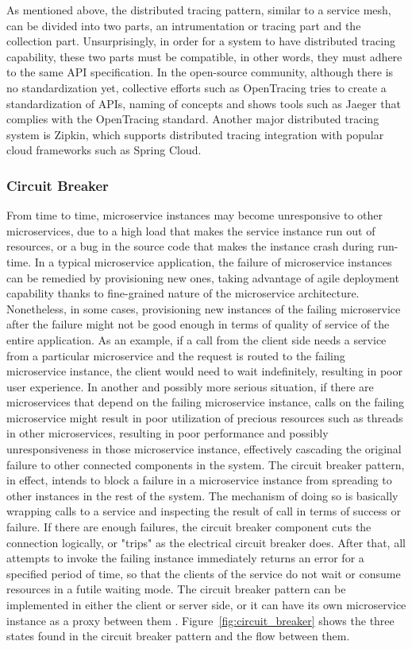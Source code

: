 \documentclass{Configuration_Files/PoliMi3i_thesis}
\begin{document}
As mentioned above, the distributed tracing pattern, similar to a service mesh, can be divided into two parts, an intrumentation or tracing part and the collection part.
Unsurprisingly, in order for a system to have distributed tracing capability, these two parts must be compatible, in other words, they must adhere to the same API specification.
In the open-source community, although there is no standardization yet, collective efforts such as OpenTracing tries to create a standardization of APIs, naming of concepts and shows tools such as Jaeger that complies with the OpenTracing standard.
Another major distributed tracing system is Zipkin, which supports distributed tracing integration with popular cloud frameworks such as Spring Cloud.

\subsubsection{Circuit Breaker}
\label{subsubsec:circuit_breaker}

From time to time, microservice instances may become unresponsive to other microservices, due to a high load that makes the service instance run out of resources, or a bug in the source code that makes the instance crash during run-time.
In a typical microservice application, the failure of microservice instances can be remedied by provisioning new ones, taking advantage of agile deployment capability thanks to fine-grained nature of the microservice architecture.
Nonetheless, in some cases, provisioning new instances of the failing microservice after the failure might not be good enough in terms of quality of service of the entire application.
As an example, if a call from the client side needs a service from a particular microservice and the request is routed to the failing microservice instance, the client would need to wait indefinitely, resulting in poor user experience.
In another and possibly more serious situation, if there are microservices that depend on the failing microservice instance, calls on the failing microservice might result in poor utilization of precious resources such as threads in other microservices, resulting in poor performance and possibly unresponsiveness in those microservice instance, effectively cascading the original failure to other connected components in the system.
The circuit breaker pattern, in effect, intends to block a failure in a microservice instance from spreading to other instances in the rest of the system.
The mechanism of doing so is basically wrapping calls to a service and inspecting the result of call in terms of success or failure.
If there are enough failures, the circuit breaker component cuts the connection logically, or "trips" as the electrical circuit breaker does.
After that, all attempts to invoke the failing instance immediately returns an error for a specified period of time, so that the clients of the service do not wait or consume resources in a futile waiting mode.
The circuit breaker pattern can be implemented in either the client or server side, or it can have its own microservice instance as a proxy between them \cite{montesi2016circuit}.
Figure~\ref{fig:circuit_breaker} shows the three states found in the circuit breaker pattern and the flow between them.
\end{document}
